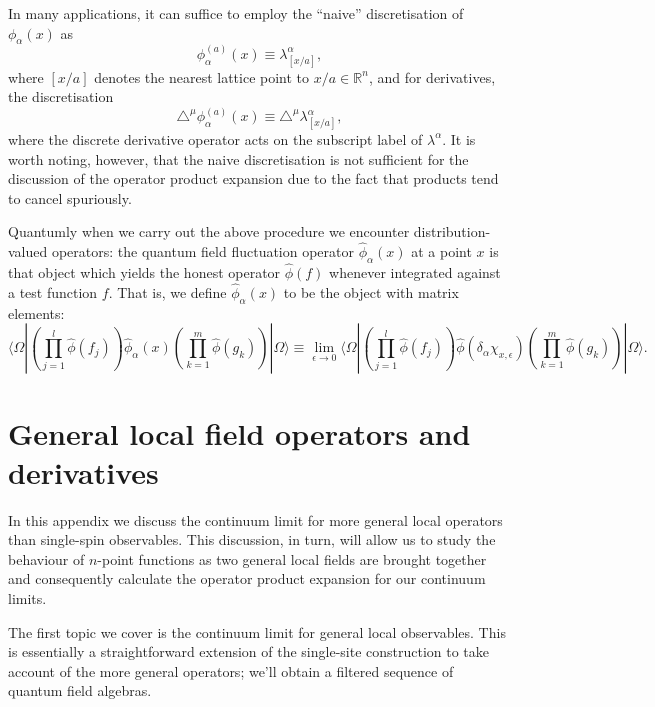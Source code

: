 \documentclass[prl,twocolumn,lengthcheck,superscriptaddress]{revtex4-1}
\theoremstyle{definition}
\theoremstyle{remark}
\begin{document}
In many applications, it can suffice to employ the ``naive'' discretisation of $\phi_\alpha(x)$ as
\begin{equation}
	\phi_\alpha^{(a)}(x) \equiv \lambda_{[x/a]}^\alpha,
\end{equation}
where $[x/a]$ denotes the nearest lattice point to $x/a\in \mathbb{R}^n$, and for derivatives, the discretisation
\begin{equation}
	\triangle^\mu \phi_\alpha^{(a)}(x) \equiv \triangle^\mu \lambda_{[x/a]}^\alpha,
\end{equation} 
where the discrete derivative operator acts on the subscript label of $\lambda^\alpha$. It is worth noting, however, that the naive discretisation is not sufficient for the discussion of the operator product expansion due to the fact that products tend to cancel spuriously. 

Quantumly when we carry out the above procedure we encounter distribution-valued operators: the quantum field fluctuation operator $\widehat{\phi}_{\alpha}(x)$ at a point $x$ is that object which yields the honest operator $\widehat{\phi}(f)$ whenever integrated against a test function $f$. That is, we define $\widehat{\phi}_{\alpha}(x)$ to be the object with matrix elements:
\begin{equation}\label{eq:qsctslimit}
	\langle\Omega|\left(\prod_{j=1}^l\widehat{\phi}(f_j)\right)\widehat{\phi}_\alpha(x)\left(\prod_{k=1}^m\widehat{\phi}(g_k)\right)|\Omega\rangle \equiv \lim_{\epsilon\rightarrow 0}\langle\Omega|\left(\prod_{j=1}^l\widehat{\phi}(f_j)\right)\widehat{\phi}(\delta_{\alpha}\chi_{x,\epsilon})\left(\prod_{k=1}^m\widehat{\phi}(g_k)\right)|\Omega\rangle.
\end{equation}


\section{General local field operators and derivatives}
In this appendix we discuss the continuum limit for more general local operators than single-spin observables. This discussion, in turn, will allow us to study the behaviour of $n$-point functions as two general local fields are brought together and consequently calculate the operator product expansion for our continuum limits. 

The first topic we cover is the continuum limit for general local observables. This is essentially a straightforward extension of the single-site construction to take account of the more general operators; we'll obtain a filtered sequence of quantum field algebras. 
\end{document}
